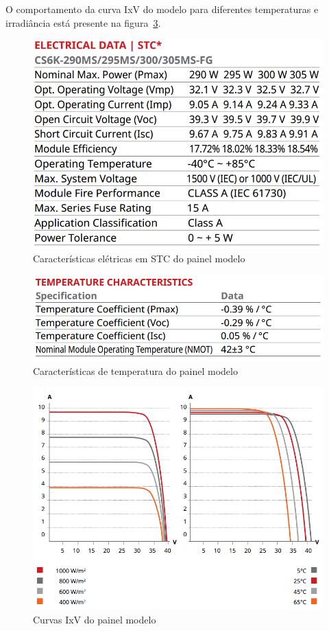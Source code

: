 \documentclass[
	12pt,				%
	openright,			%
	onseside,
	a4paper,			%
	english,			%
	french,				%
	spanish,			%
	brazil,				%
	]{abntex2}
\begin{document}
O comportamento da curva IxV do modelo para diferentes temperaturas e irradiância está presente na figura~\ref{fig:IV_pv_cs}. 
\begin{figure}[htbp]%
	\begin{center}%
		\includegraphics[width=0.55 \linewidth]{elet_canadian_300}
		\caption{Características elétricas em STC do painel modelo \cite{Canadian_Datasheet}}
		\label{fig:pv_elet}
	\end{center}
\end{figure}

\begin{figure}[htbp]%
	\begin{center}%
		\includegraphics[width=0.55 \linewidth]{temp_canad_300}
		\caption{Características de temperatura do painel modelo \cite{Canadian_Datasheet}}
		\label{fig:pv_temp}
	\end{center}
\end{figure}

\begin{figure}[htbp]%
	\begin{center}%
		\includegraphics[width=0.55 \linewidth]{AV_canad_300}
		\caption{Curvas IxV do painel modelo \cite{Canadian_Datasheet}}
		\label{fig:IV_pv_cs}
	\end{center}
\end{figure}
\end{document}

